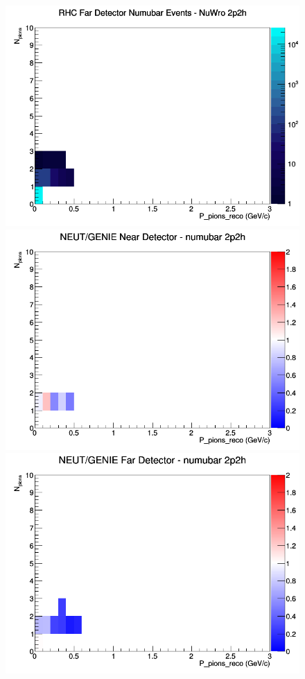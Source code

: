 \documentclass[12pt]{article}
\begin{document}
\begin{figure}[h]
\endminipage
{}
\includegraphics[width=\linewidth]{eff_N_P/LAr/pions/2p2h_RHC_FD_numubar_N_P_NuWro.png}
\endminipage
\newline
{}
\includegraphics[width=\linewidth]{eff_N_P/LAr/pions/ratios/2p2h_NEUT_GENIE_numubar_near_N_P.png}
\endminipage
{}
\includegraphics[width=\linewidth]{eff_N_P/LAr/pions/ratios/2p2h_NEUT_GENIE_numubar_far_N_P.png}

\end{figure}
\end{document}

